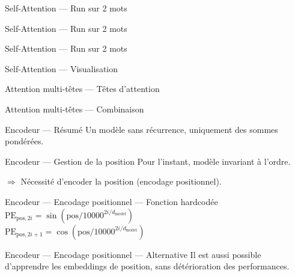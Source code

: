 \begin{frame}{Self-Attention --- Run sur 2 mots}
\end{frame}

\begin{frame}{Self-Attention --- Run sur 2 mots}
\end{frame}

\begin{frame}{Self-Attention --- Run sur 2 mots}
\end{frame}

\begin{frame}{Self-Attention --- Visualisation}
\end{frame}

\begin{frame}{Attention multi-têtes --- Têtes d'attention}
\end{frame}

\begin{frame}{Attention multi-têtes --- Combinaison}
\end{frame}

\begin{frame}{Encodeur --- Résumé}
  Un modèle sans récurrence, uniquement des sommes pondérées.

\end{frame}

\begin{frame}{Encodeur --- Gestion de la position}
  Pour l'instant, modèle invariant à l'ordre.

  $\Rightarrow$ Nécessité d'encoder la position (encodage positionnel).
\end{frame}

\begin{frame}{Encodeur --- Encodage positionnel --- Fonction hardcodée}
  $\text{PE}_{\text{pos}, 2i} = \sin{(\text{pos} / 10000^{2i / d_{\text{model}}})}$ \\
  $\text{PE}_{\text{pos}, 2i + 1}= \cos{(\text{pos} / 10000^{2i / d_{\text{model}}})}$
\end{frame}

\begin{frame}{Encodeur --- Encodage positionnel --- Alternative}
  Il est aussi possible d'apprendre les embeddings de position, sans détérioration des performances.
\end{frame}

